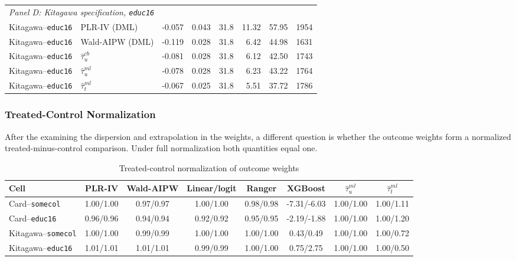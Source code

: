 \documentclass[12pt, a4paper, oneside]{article}
\theoremstyle{plain}
\theoremstyle{definition}
\begin{document}
\begin{table}[htbp]
\begin{tabular}{llrrrrrr}
\multicolumn{8}{l}{\textit{Panel D: Kitagawa specification, \texttt{educ16}}} \\
Kitagawa--\texttt{educ16} & PLR-IV (DML) & -0.057 & 0.043 & 31.8 & 11.32 & 57.95 & 1954 \\
Kitagawa--\texttt{educ16} & Wald-AIPW (DML) & -0.119 & 0.028 & 31.8 & 6.42 & 44.98 & 1631 \\
Kitagawa--\texttt{educ16} & $\hat{\tau}^{cb}_{u}$ & -0.081 & 0.028 & 31.8 & 6.12 & 42.50 & 1743 \\
Kitagawa--\texttt{educ16} & $\hat{\tau}^{ml}_{u}$ & -0.078 & 0.028 & 31.8 & 6.23 & 43.22 & 1764 \\
Kitagawa--\texttt{educ16} & $\hat{\tau}^{ml}_{t}$ & -0.067 & 0.025 & 31.8 & 5.51 & 37.72 & 1786 \\
\bottomrule
\end{tabular}

\vspace{4pt}
\end{table}

\subsubsection{Treated-Control Normalization}
After the examining the dispersion and extrapolation in the weights, a different question is whether the outcome weights form a normalized treated-minus-control comparison. 
Under full normalization both quantities equal one. 
\begin{table}[htbp]
\centering
\caption{Treated-control normalization of outcome weights}
\label{tab:treat_norm_card}
\scriptsize
\setlength{\tabcolsep}{3.5pt}
\begin{tabular}{lccccccc}
\toprule
Cell & PLR-IV & Wald-AIPW & Linear/logit & Ranger & XGBoost & $\hat{\tau}^{ml}_{u}$ & $\hat{\tau}^{ml}_{t}$ \\
\midrule
Card--\texttt{somecol}     & 1.00/1.00 & 0.97/0.97 & 1.00/1.00 & 0.98/0.98 & -7.31/-6.03 & 1.00/1.00 & 1.00/1.11 \\
Card--\texttt{educ16}      & 0.96/0.96 & 0.94/0.94 & 0.92/0.92 & 0.95/0.95 & -2.19/-1.88 & 1.00/1.00 & 1.00/1.20 \\
Kitagawa--\texttt{somecol} & 1.00/1.00 & 0.99/0.99 & 1.00/1.00 & 1.00/1.00 &  0.43/0.49  & 1.00/1.00 & 1.00/0.72 \\
Kitagawa--\texttt{educ16}  & 1.01/1.01 & 1.01/1.01 & 0.99/0.99 & 1.00/1.00 &  0.75/2.75  & 1.00/1.00 & 1.00/0.50 \\
\bottomrule
\end{tabular}

\vspace{4pt}
\end{table}
\end{document}
